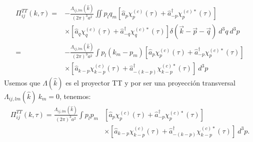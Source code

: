 \begin{equation*}
    \begin{split}
        \Pi^{TT}_{ij} (k,\tau) =& - \frac{\Lambda_{ij,lm} (\hat{k})}{(2 \pi)^3 a^2} \iint p_l q_m \left[ \hat{a}_p \chi^{(c)}_p (\tau) + \hat{a}^\dagger_{-p} \chi^{(c) *}_p (\tau) \right] \\
        & \times \left[ \hat{a}_q \chi^{(c)}_q (\tau) + \hat{a}^\dagger_{-q} \chi^{(c) *}_q (\tau) \right] \delta \left( \vec{k} - \vec{p} - \vec{q} \right) ~ d^3 q ~ d^3 p\\
        =& - \frac{\Lambda_{ij,lm} (\hat{k})}{(2 \pi)^3 a^2} \int p_l (k_m - p_m) \left[ \hat{a}_p \chi^{(c)}_p (\tau) + \hat{a}^\dagger_{-p} \chi^{(c) *}_p (\tau) \right] \\
        & \times \left[ \hat{a}_{k - p} \chi^{(c)}_{k - p} (\tau) + \hat{a}^\dagger_{-(k - p)} \chi^{(c) *}_{k - p} (\tau) \right] ~ d^3 p
    \end{split}
\end{equation*}
Usemos que $\Lambda(\hat{k})$ es el proyector TT y por ser una proyección transversal $\Lambda_{ij,lm} (\hat{k}) ~ k_m = 0$, tenemos:
\begin{equation}
    \begin{split}
        \Pi^{TT}_{ij} (k,\tau) = \frac{\Lambda_{ij,lm} (\hat{k})}{(2 \pi)^3 a^2} \int p_l p_m &\left[ \hat{a}_p \chi^{(c)}_p (\tau) + \hat{a}^\dagger_{-p} \chi^{(c) *}_p (\tau) \right] \\ &\times \left[ \hat{a}_{k - p} \chi^{(c)}_{k - p} (\tau) + \hat{a}^\dagger_{-(k - p)} \chi^{(c) *}_{k - p} (\tau) \right] ~ d^3 p.
    \end{split}
\end{equation}

